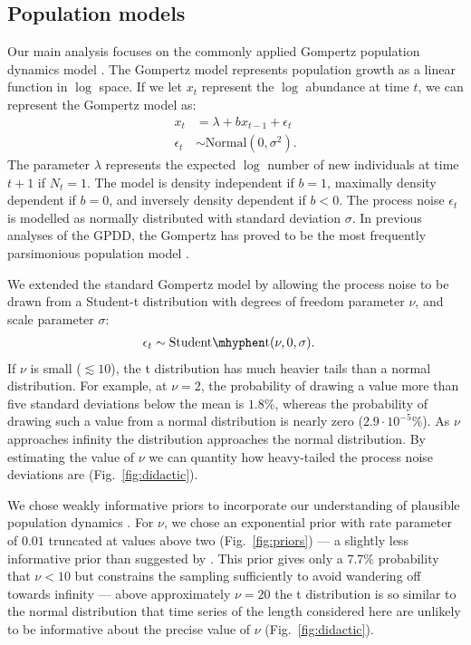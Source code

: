 \subsection{Population models}

Our main analysis focuses on the commonly applied Gompertz population dynamics
model \citep[e.g.][]{knape2012,dennis2014,connors2014}. The Gompertz model
represents population growth as a linear function in $\log$ space. If we let
$x_t$ represent the $\log$ abundance at time $t$, we can represent the Gompertz
model as:
\begin{align*}
x_t &= \lambda + b x_{t-1} + \epsilon_t\\
\epsilon_t &\sim \mathrm{Normal}(0, \sigma^2).
\end{align*}
The parameter $\lambda$ represents the expected $\log$ number of new
individuals at time $t + 1$ if $N_t = 1$. The model is density independent if
$b = 1$, maximally density dependent if $b = 0$, and inversely density
dependent if $b < 0$. The process noise $\epsilon_t$ is modelled as normally
distributed with standard deviation $\sigma$. In previous analyses of the GPDD,
the Gompertz has proved to be the most frequently parsimonious population model
\citep{brook2006}.

We extended the standard Gompertz model by allowing the process noise to be
drawn from a Student-t distribution with degrees of freedom parameter $\nu$,
and scale parameter $\sigma$:
\begin{align*}
\epsilon_t &\sim \mathrm{Student\mhyphen t}(\nu, 0, \sigma).
\end{align*}
If $\nu$ is small ($\lesssim 10$), the t distribution has much heavier tails
than a normal distribution. For example, at $\nu = 2$, the probability of
drawing a value more than five standard deviations below the mean is $1.8$\%,
whereas the probability of drawing such a value from a normal distribution is
nearly zero ($2.9\cdot10^{-5}$\%). As $\nu$ approaches infinity the
distribution approaches the normal distribution. By estimating the value of
$\nu$ we can quantity how heavy-tailed the process noise deviations are
(Fig.~\ref{fig:didactic}).

We chose weakly informative priors to incorporate our understanding of
plausible population dynamics \citep[Supporting Material]{gelman2014}. For
$\nu$, we chose an exponential prior with rate parameter of $0.01$ truncated at
values above two (Fig.~\ref{fig:priors}) --- a slightly less informative prior
than suggested by \citet{fernandez1998}. This prior gives only a 7.7\%
probability that $\nu < 10$ but constrains the sampling sufficiently to avoid
wandering off towards infinity --- above approximately $\nu = 20$ the
t distribution is so similar to the normal distribution that time series of the
length considered here are unlikely to be informative about the precise value
of $\nu$ (Fig.~\ref{fig:didactic}).

